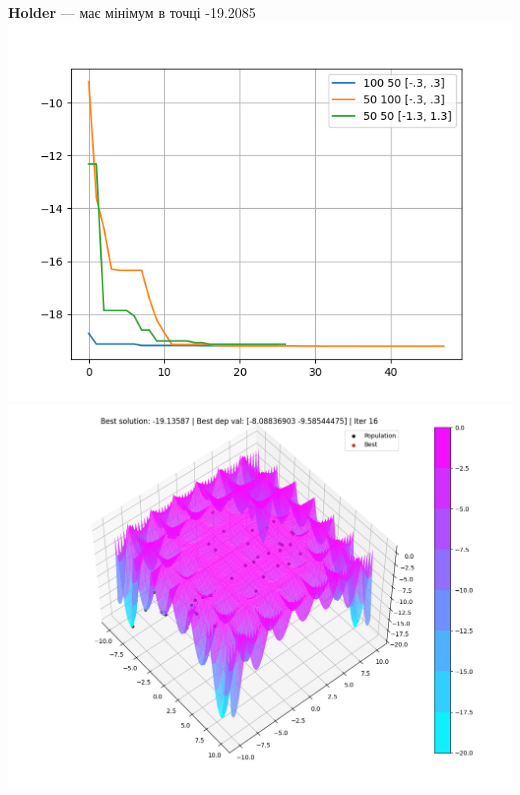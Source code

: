 \documentclass{article}
\begin{document}
        \newpage
        \textbf{Holder} --- має мінімум в точці -19.2085
            \newline
            \includegraphics[scale=0.7]{Holder_dif.png}
            \newline
            \includegraphics[scale=0.7]{Holder.jpg}
            \newline
\end{document}
